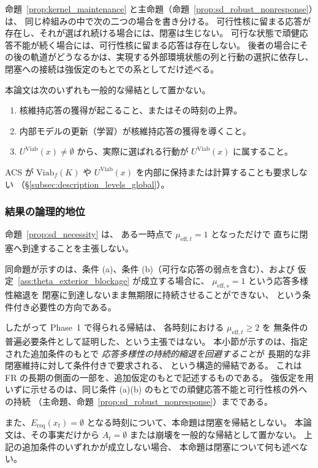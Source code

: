 \begin{remark}[結果の差と非主張事項]
\label{rem:kernel_response_scope}
命題~\ref{prop:kernel_maintenance} と主命題（命題~\ref{prop:sd_robust_nonresponse}）は、
同じ枠組みの中で次の二つの場合を書き分ける。
可行性核に留まる応答が存在し、それが選ばれ続ける場合には、閉塞は生じない。
可行な状態で頑健応答不能が続く場合には、可行性核に留まる応答は存在しない。
後者の場合にその後の軌道がどうなるかは、実現する外部環境状態の列と行動の選択に依存し、
閉塞への接続は強仮定のもとでの系としてだけ述べる。

本論文は次のいずれも一般的な帰結として置かない。
\begin{enumerate}
  \item 核維持応答の獲得が起こること、またはその時刻の上界。
  \item 内部モデルの更新（学習）が核維持応答の獲得を導くこと。
  \item $U^{\mathrm{Viab}}(x)\neq\emptyset$ から、実際に選ばれる行動が $U^{\mathrm{Viab}}(x)$ に属すること。
\end{enumerate}
ACS が $\mathrm{Viab}_f(K)$ や $U^{\mathrm{Viab}}(x)$ を内部に保持または計算することも要求しない
（\S\ref{subsec:description_levels_global}）。
\end{remark}

\subsubsection{結果の論理的地位}

\begin{remark}
\label{rem:sd_necessity_scope}
命題~\ref{prop:sd_necessity} は、
ある一時点で $\mu_{\mathrm{eff},t}=1$ となっただけで
直ちに閉塞へ到達することを主張しない。

同命題が示すのは、条件 (a)、条件 (b)（可行な応答の弱点を含む）、および
仮定~\ref{ass:theta_exterior_blockage} が成立する場合に、
$\mu_{\mathrm{eff},s}=1$ という応答多様性縮退を
閉塞に到達しないまま無期限に持続させることができない、
という条件付き必要性の方向である。

したがって Phase~1 で得られる帰結は、
各時刻における $\mu_{\mathrm{eff},t}\ge2$ を
無条件の普遍必要条件として証明した、という主張ではない。
本小節が示すのは、指定された追加条件のもとで
\emph{応答多様性の持続的縮退を回避すること}が
長期的な非閉塞維持に対して条件付きで要求される、
という構造的帰結である。
これは FR の長期の側面の一部を、追加仮定のもとで記述するものである。
強仮定を用いずに示せるのは、同じ条件 (a)(b) のもとでの頑健応答不能と可行性核の外への持続
（主命題、命題~\ref{prop:sd_robust_nonresponse}）までである。

また、$E_{\mathrm{req}}(x_t)=\emptyset$ となる時刻について、本命題は閉塞を帰結としない。
本論文は、その事実だけから $A_t=\emptyset$ または崩壊を一般的な帰結として置かない。
上記の追加条件のいずれかが成立しない場合、
本命題は閉塞について何も述べない。
\end{remark}


